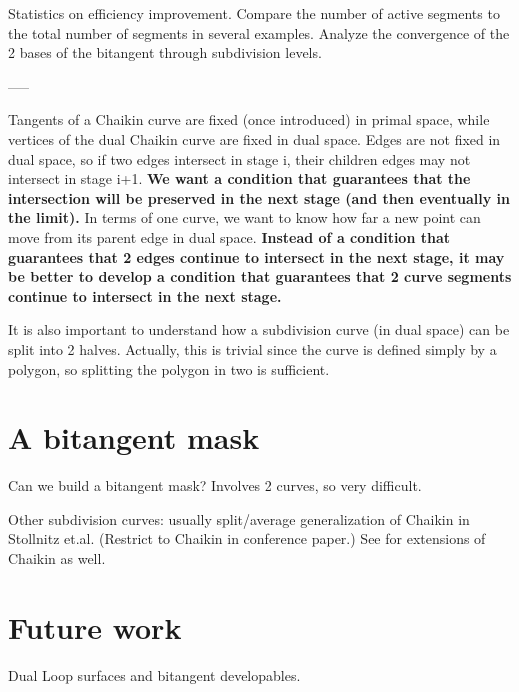 \documentclass[12pt]{article}
\begin{document}
Statistics on efficiency improvement.
Compare the number of active segments to the total number of segments
in several examples.
Analyze the convergence of the 2 bases of the bitangent through subdivision
levels.

-----

Tangents of a Chaikin curve are fixed (once introduced) in primal space,
while vertices of the dual Chaikin curve are fixed in dual space.
Edges are not fixed in dual space, so if two edges intersect in stage i,
their children edges may not intersect in stage i+1.
{\bf We want a condition that guarantees that the intersection will be preserved in
the next stage (and then eventually in the limit).}
In terms of one curve, we want to know how far a new point can move from its parent edge
in dual space.
{\bf Instead of a condition that guarantees that 2 edges continue to intersect in the next stage,
it may be better to develop a condition that guarantees that 2 curve segments continue to
intersect in the next stage.}

It is also important to understand how a subdivision curve (in dual space) can be split
into 2 halves.
Actually, this is trivial since the curve is defined simply by a polygon,
so splitting the polygon in two is sufficient.


\section{A bitangent mask}

Can we build a bitangent mask?  Involves 2 curves, so very difficult.

Other subdivision curves: usually split/average generalization of Chaikin
in Stollnitz et.al. (Restrict to Chaikin in conference paper.)
See \cite{lane80} for extensions of Chaikin as well.


\clearpage

\section{Future work}

Dual Loop surfaces and bitangent developables.

\end{document}
